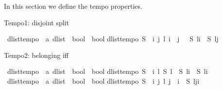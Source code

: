 \begin{isabellebody}
\isamarkupfalse%
\isanewline
%
\isamarkuptrue%
%
\begin{isamarkuptext}%
In this section we define the tempo properties.%
\end{isamarkuptext}\isamarkuptrue%
%
\begin{isamarkuptext}%
Tempo1: disjoint split%
\end{isamarkuptext}\isamarkuptrue%
\isamarkupfalse%
\ dlist{\isacharunderscore}tempo{}\ {\isacharcolon}{\isacharcolon}\ {\isachardoublequoteopen}{\isacharparenleft}{\isacharprime}a\ dlist\ {\isasymRightarrow}\ bool{\isacharparenright}\ {\isasymRightarrow}\ bool{\isachardoublequoteclose}\isanewline
{}\isanewline
{\isachardoublequoteopen}dlist{\isacharunderscore}tempo{}\ S\ {\isasymequiv}\ {\isasymforall}i\ j\ l{\isachardot}\ i\ {\isasymle}\ j\ {\isasymlongrightarrow}\ {\isasymnot}\ {\isacharparenleft}{\isacharparenleft}S\ {\isacharparenleft}l{\isasymdagger}{\isachardot}{\isachardot}i{\isacharparenright}\ {\isasymand}\ S\ {\isacharparenleft}l{\isasymdagger}j{\isachardot}{\isachardot}{\isacharparenright}{\isacharparenright}{\isacharparenright}{\isachardoublequoteclose}%
\begin{isamarkuptext}%
Tempo2: belonging iff%
\end{isamarkuptext}\isamarkuptrue%
\isamarkupfalse%
\ dlist{\isacharunderscore}tempo{}\ {\isacharcolon}{\isacharcolon}\ {\isachardoublequoteopen}{\isacharparenleft}{\isacharprime}a\ dlist\ {\isasymRightarrow}\ bool{\isacharparenright}\ {\isasymRightarrow}\ bool{\isachardoublequoteclose}\isanewline
{}\isanewline
{\isachardoublequoteopen}dlist{\isacharunderscore}tempo{}\ S\ {\isasymequiv}\ {\isasymforall}i\ l{\isachardot}\ S\ l\ {\isasymlongleftrightarrow}\ {\isacharparenleft}S\ {\isacharparenleft}l{\isasymdagger}{\isachardot}{\isachardot}i{\isacharparenright}\ {\isasymor}\ S\ {\isacharparenleft}l{\isasymdagger}i{\isachardot}{\isachardot}{\isacharparenright}{\isacharparenright}{\isachardoublequoteclose}\isanewline
\isanewline
{}\isamarkupfalse%
\ dlist{\isacharunderscore}tempo{}\ {\isacharcolon}{\isacharcolon}\ {\isachardoublequoteopen}{\isacharparenleft}{\isacharprime}a\ dlist\ {\isasymRightarrow}\ bool{\isacharparenright}\ {\isasymRightarrow}\ bool{\isachardoublequoteclose}\isanewline
{}\isanewline
{\isachardoublequoteopen}dlist{\isacharunderscore}tempo{}\ S\ {\isasymequiv}\ {\isasymforall}i\ j\ l{\isachardot}\ j\ {\isacharless}\ i\ {\isasymlongrightarrow}\ {\isacharparenleft}S\ {\isacharparenleft}l{\isasymdagger}j{\isachardot}{\isachardot}i{\isacharparenright}\ {\isasymlongleftrightarrow}\ \isanewline

\end{isabellebody}
